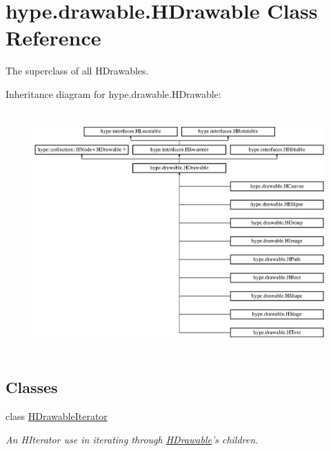 \hypertarget{classhype_1_1drawable_1_1_h_drawable}{\section{hype.\-drawable.\-H\-Drawable Class Reference}
\label{classhype_1_1drawable_1_1_h_drawable}
}


The superclass of all H\-Drawables.  


Inheritance diagram for hype.\-drawable.\-H\-Drawable\-:\begin{figure}[H]
\begin{center}
\leavevmode
\includegraphics[height=9.333334cm]{classhype_1_1drawable_1_1_h_drawable}
\end{center}
\end{figure}
\subsection*{Classes}
\begin{DoxyCompactItemize}
\item 
class \hyperlink{classhype_1_1drawable_1_1_h_drawable_1_1_h_drawable_iterator}{H\-Drawable\-Iterator}
\begin{DoxyCompactList}\small\item\em An H\-Iterator use in iterating through \hyperlink{classhype_1_1drawable_1_1_h_drawable}{H\-Drawable}'s children. \end{DoxyCompactList}\end{DoxyCompactItemize}
